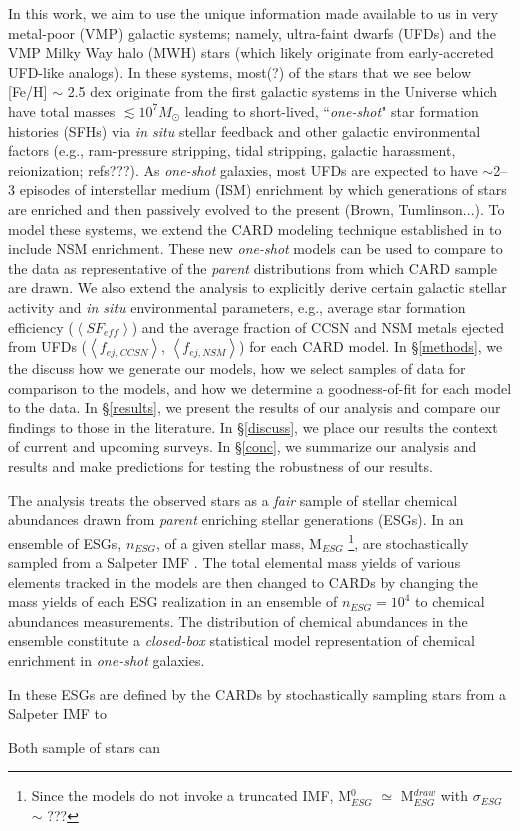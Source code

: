In this work, we aim to use the unique information made available to us in very metal-poor (VMP) galactic systems; namely, ultra-faint dwarfs (UFDs) and the VMP Milky Way halo (MWH) stars (which likely originate from early-accreted UFD-like analogs). In these systems, most(?) of the stars that we see below [Fe/H] $\sim$ 2.5 dex originate from the first galactic systems in the Universe which have total masses $\lesssim10^7 M_\odot$ leading to short-lived, ``{\it one-shot}" star formation histories (SFHs) via {\it in situ} stellar feedback and other galactic environmental factors (e.g., ram-pressure stripping, tidal stripping, galactic harassment, reionization; refs???). As {\it one-shot} galaxies, most UFDs are expected to have $\sim$2--3 episodes of interstellar medium (ISM) enrichment by which generations of stars are enriched and then passively evolved to the present (Brown, Tumlinson...). To model these systems, we extend the CARD modeling technique established in \cite{Lee_2013} to include NSM enrichment. These new {\it one-shot} models can be used to compare to the data as representative of the {\it parent} distributions from which CARD sample are drawn. We also extend the \cite{Lee_2013} analysis to explicitly derive certain galactic stellar activity and {\it in situ} environmental parameters, e.g., average star formation efficiency ($\left<SF_{eff}\right>$) and the average fraction of CCSN and NSM metals ejected from UFDs ($\left<f_{ej,CCSN}\right>$, $\left<f_{ej,NSM}\right>$) for each CARD model. In \S\ref{methods}, we the discuss how we generate our models, how we select samples of data for comparison to the models, and how we determine a goodness-of-fit for each model to the data. In \S\ref{results}, we present the results of our analysis and compare our findings to those in the literature. In \S\ref{discuss}, we place our results the context of current and upcoming surveys. In \S\ref{conc}, we summarize our analysis and results and make predictions for testing the robustness of our results.



The analysis treats the observed stars as a {\it fair} sample of stellar chemical abundances drawn from {\it parent} enriching stellar generations (ESGs). In \cite{Lee_2013} an ensemble of ESGs, $n_{ESG}$, of a given stellar mass, M$_{ESG}$
\footnote{Since the models do not invoke a truncated IMF, M$_{ESG}^0$ $\simeq$ M$_{ESG}^{draw}$ with $\sigma_{ESG}$ $\sim$ ???}, 
are stochastically sampled from a Salpeter IMF \citep{Salpeter_1955}. The total elemental mass yields of various elements tracked in the models are then changed to CARDs by changing the mass yields of each ESG realization in an ensemble of $n_{ESG} = 10^4$ to chemical abundances measurements. The distribution of chemical abundances in the ensemble constitute a {\it closed-box} statistical model representation of chemical enrichment in {\it one-shot} galaxies. 


In \cite{Lee_2013} these ESGs are defined by the CARDs by stochastically sampling stars from a Salpeter IMF \citep{Salpeter_1955} to    

Both sample of stars can 